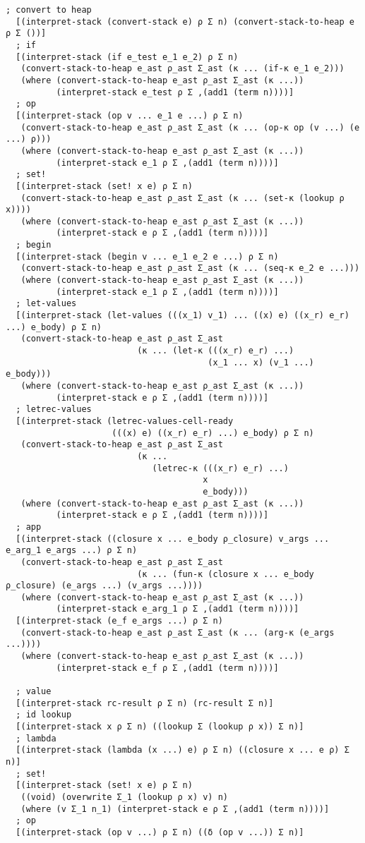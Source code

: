 \begin{lstlisting}[language=pltredex,
                basicstyle=\ttfamily\scriptsize,
                numbers=none, xleftmargin=2em]
  ; convert to heap
  [(interpret-stack (convert-stack e) ρ Σ n) (convert-stack-to-heap e ρ Σ ())]
  ; if
  [(interpret-stack (if e_test e_1 e_2) ρ Σ n)
   (convert-stack-to-heap e_ast ρ_ast Σ_ast (κ ... (if-κ e_1 e_2)))
   (where (convert-stack-to-heap e_ast ρ_ast Σ_ast (κ ...))
          (interpret-stack e_test ρ Σ ,(add1 (term n))))]
  ; op
  [(interpret-stack (op v ... e_1 e ...) ρ Σ n)
   (convert-stack-to-heap e_ast ρ_ast Σ_ast (κ ... (op-κ op (v ...) (e ...) ρ)))
   (where (convert-stack-to-heap e_ast ρ_ast Σ_ast (κ ...))
          (interpret-stack e_1 ρ Σ ,(add1 (term n))))]
  ; set!
  [(interpret-stack (set! x e) ρ Σ n)
   (convert-stack-to-heap e_ast ρ_ast Σ_ast (κ ... (set-κ (lookup ρ x))))
   (where (convert-stack-to-heap e_ast ρ_ast Σ_ast (κ ...))
          (interpret-stack e ρ Σ ,(add1 (term n))))]
  ; begin
  [(interpret-stack (begin v ... e_1 e_2 e ...) ρ Σ n)
   (convert-stack-to-heap e_ast ρ_ast Σ_ast (κ ... (seq-κ e_2 e ...)))
   (where (convert-stack-to-heap e_ast ρ_ast Σ_ast (κ ...))
          (interpret-stack e_1 ρ Σ ,(add1 (term n))))]
  ; let-values
  [(interpret-stack (let-values (((x_1) v_1) ... ((x) e) ((x_r) e_r) ...) e_body) ρ Σ n)
   (convert-stack-to-heap e_ast ρ_ast Σ_ast
                          (κ ... (let-κ (((x_r) e_r) ...)
                                        (x_1 ... x) (v_1 ...) e_body)))
   (where (convert-stack-to-heap e_ast ρ_ast Σ_ast (κ ...))
          (interpret-stack e ρ Σ ,(add1 (term n))))]
  ; letrec-values
  [(interpret-stack (letrec-values-cell-ready
                     (((x) e) ((x_r) e_r) ...) e_body) ρ Σ n)
   (convert-stack-to-heap e_ast ρ_ast Σ_ast
                          (κ ...
                             (letrec-κ (((x_r) e_r) ...)
                                       x
                                       e_body)))
   (where (convert-stack-to-heap e_ast ρ_ast Σ_ast (κ ...))
          (interpret-stack e ρ Σ ,(add1 (term n))))]
  ; app
  [(interpret-stack ((closure x ... e_body ρ_closure) v_args ... e_arg_1 e_args ...) ρ Σ n)
   (convert-stack-to-heap e_ast ρ_ast Σ_ast
                          (κ ... (fun-κ (closure x ... e_body ρ_closure) (e_args ...) (v_args ...))))
   (where (convert-stack-to-heap e_ast ρ_ast Σ_ast (κ ...))
          (interpret-stack e_arg_1 ρ Σ ,(add1 (term n))))]
  [(interpret-stack (e_f e_args ...) ρ Σ n)
   (convert-stack-to-heap e_ast ρ_ast Σ_ast (κ ... (arg-κ (e_args ...))))
   (where (convert-stack-to-heap e_ast ρ_ast Σ_ast (κ ...))
          (interpret-stack e_f ρ Σ ,(add1 (term n))))]

  ; value
  [(interpret-stack rc-result ρ Σ n) (rc-result Σ n)]
  ; id lookup
  [(interpret-stack x ρ Σ n) ((lookup Σ (lookup ρ x)) Σ n)]
  ; lambda
  [(interpret-stack (lambda (x ...) e) ρ Σ n) ((closure x ... e ρ) Σ n)]
  ; set!
  [(interpret-stack (set! x e) ρ Σ n)
   ((void) (overwrite Σ_1 (lookup ρ x) v) n)
   (where (v Σ_1 n_1) (interpret-stack e ρ Σ ,(add1 (term n))))]
  ; op
  [(interpret-stack (op v ...) ρ Σ n) ((δ (op v ...)) Σ n)]


\end{lstlisting}
